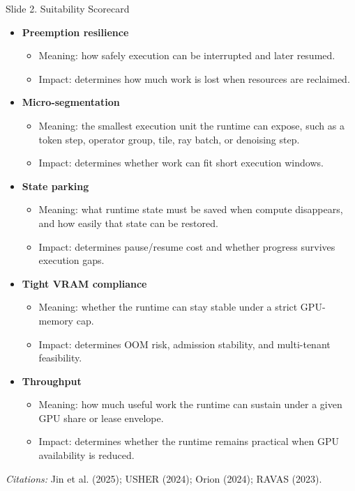 \documentclass[aspectratio=169]{beamer}
\newcommand{\slidecite}[1]{\vspace{0.35em}\par{\tiny\raggedright\textit{Citations: }#1\par}}
\begin{document}
\begin{frame}[t,shrink=6]{Slide 2. Suitability Scorecard}
\footnotesize
\begin{itemize}
  \item \textbf{Preemption resilience}
  \begin{itemize}
    \item Meaning: how safely execution can be interrupted and later resumed.
    \item Impact: determines how much work is lost when resources are reclaimed.
  \end{itemize}
  \item \textbf{Micro-segmentation}
  \begin{itemize}
    \item Meaning: the smallest execution unit the runtime can expose, such as a token step, operator group, tile, ray batch, or denoising step.
    \item Impact: determines whether work can fit short execution windows.
  \end{itemize}
  \item \textbf{State parking}
  \begin{itemize}
    \item Meaning: what runtime state must be saved when compute disappears, and how easily that state can be restored.
    \item Impact: determines pause/resume cost and whether progress survives execution gaps.
  \end{itemize}
  \item \textbf{Tight VRAM compliance}
  \begin{itemize}
    \item Meaning: whether the runtime can stay stable under a strict GPU-memory cap.
    \item Impact: determines OOM risk, admission stability, and multi-tenant feasibility.
  \end{itemize}
  \item \textbf{Throughput}
  \begin{itemize}
    \item Meaning: how much useful work the runtime can sustain under a given GPU share or lease envelope.
    \item Impact: determines whether the runtime remains practical when GPU availability is reduced.
  \end{itemize}
\end{itemize}
\slidecite{Jin et al. (2025); USHER (2024); Orion (2024); RAVAS (2023).}
\end{frame}
\end{document}
